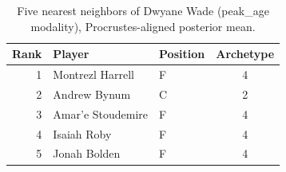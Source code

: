 \begin{table}[htbp]
  \centering\small
  \begin{tabular}{rllc}
    \toprule
    Rank & Player & Position & Archetype \\
    \midrule
    1 & Montrezl Harrell & F & 4 \\
    2 & Andrew Bynum & C & 2 \\
    3 & Amar'e Stoudemire & F & 4 \\
    4 & Isaiah Roby & F & 4 \\
    5 & Jonah Bolden & F & 4 \\
    \bottomrule
  \end{tabular}
  \caption{Five nearest neighbors of Dwyane Wade (peak_age modality), Procrustes-aligned posterior mean.}
  \label{tab:Dwyane_Wade_neighbors_peak_age}
\end{table}

